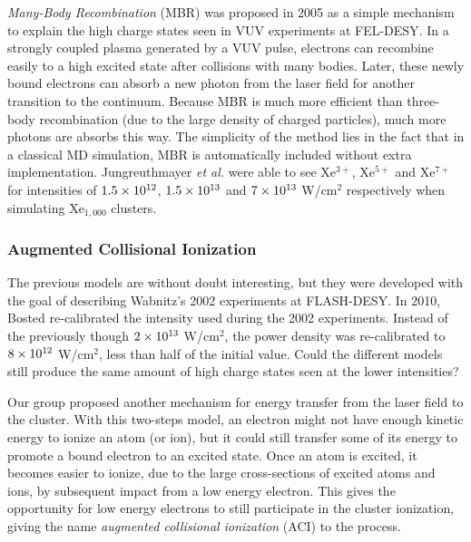 \textit{Many-Body Recombination} (MBR) was proposed in 2005
as a simple mechanism to explain the high charge states seen in VUV
experiments at FEL-DESY\cite{Jungreuthmayer2005}. In a strongly coupled plasma
generated by a VUV pulse, electrons can recombine easily to a high excited
state after collisions with many bodies. Later, these newly bound electrons can
absorb a new photon from the laser field for another transition to the
continuum. Because MBR is much more efficient than three-body
recombination (due to the large density of charged particles), much more
photons are absorbs this way. The simplicity of the
method lies in the fact that in a classical MD simulation, MBR is automatically
included without extra implementation. Jungreuthmayer \textit{et al.} were able
to see Xe$^{3+}$, Xe$^{5+}$ and Xe$^{7+}$ for intensities of $\ten{1.5}{12}$,
$\ten{1.5}{13}$ and $\ten{7}{13}$ W/cm$^2$ respectively when simulating
Xe$_{1,000}$ clusters.


\subsubsection{Augmented Collisional Ionization}
The previous models are without doubt interesting, but they were developed with
the goal of describing Wabnitz's 2002 experiments at FLASH-DESY. In 2010, Bosted
re-calibrated the intensity used during the 2002 experiments.
Instead of the previously though $\ten{2}{13}$ W/cm$^2$, the power density was
re-calibrated to $\ten{8}{12}$ W/cm$^2$, less than half of the initial value.
Could the different models still produce the same amount of high charge states
seen at the lower intensities?

Our group proposed another mechanism for energy transfer from the laser field
to the cluster. With this two-steps model, an electron might not have enough
kinetic energy to ionize an atom (or ion), but it could still transfer some of
its energy to promote a bound electron to an excited state. Once an atom is
excited, it becomes easier to ionize, due to the large cross-sections of excited
atoms and ions, by subsequent impact from a low energy electron. This gives the
opportunity for low energy electrons to still participate in the cluster
ionization, giving the name \textit{augmented collisional ionization} (ACI) to
the process.

